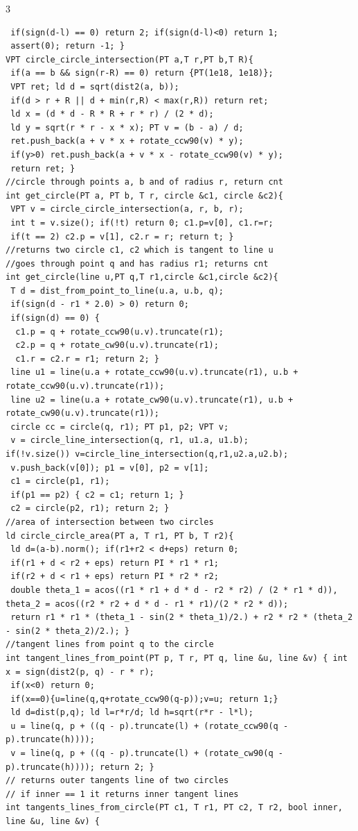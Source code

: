 \documentclass[8pt,a4paper,onesided]{article}
\begin{document}
\begin{multicols}{3}
\begin{verbatim}
 if(sign(d-l) == 0) return 2; if(sign(d-l)<0) return 1;
 assert(0); return -1; }
VPT circle_circle_intersection(PT a,T r,PT b,T R){
 if(a == b && sign(r-R) == 0) return {PT(1e18, 1e18)};
 VPT ret; ld d = sqrt(dist2(a, b));
 if(d > r + R || d + min(r,R) < max(r,R)) return ret;
 ld x = (d * d - R * R + r * r) / (2 * d);
 ld y = sqrt(r * r - x * x); PT v = (b - a) / d;
 ret.push_back(a + v * x + rotate_ccw90(v) * y);
 if(y>0) ret.push_back(a + v * x - rotate_ccw90(v) * y);
 return ret; }
//circle through points a, b and of radius r, return cnt
int get_circle(PT a, PT b, T r, circle &c1, circle &c2){
 VPT v = circle_circle_intersection(a, r, b, r);
 int t = v.size(); if(!t) return 0; c1.p=v[0], c1.r=r;
 if(t == 2) c2.p = v[1], c2.r = r; return t; }
//returns two circle c1, c2 which is tangent to line u
//goes through point q and has radius r1; returns cnt
int get_circle(line u,PT q,T r1,circle &c1,circle &c2){
 T d = dist_from_point_to_line(u.a, u.b, q);
 if(sign(d - r1 * 2.0) > 0) return 0;
 if(sign(d) == 0) {
  c1.p = q + rotate_ccw90(u.v).truncate(r1);
  c2.p = q + rotate_cw90(u.v).truncate(r1);
  c1.r = c2.r = r1; return 2; }
 line u1 = line(u.a + rotate_ccw90(u.v).truncate(r1), u.b + rotate_ccw90(u.v).truncate(r1));
 line u2 = line(u.a + rotate_cw90(u.v).truncate(r1), u.b + rotate_cw90(u.v).truncate(r1));
 circle cc = circle(q, r1); PT p1, p2; VPT v;
 v = circle_line_intersection(q, r1, u1.a, u1.b);
if(!v.size()) v=circle_line_intersection(q,r1,u2.a,u2.b);
 v.push_back(v[0]); p1 = v[0], p2 = v[1];
 c1 = circle(p1, r1);
 if(p1 == p2) { c2 = c1; return 1; }
 c2 = circle(p2, r1); return 2; }
//area of intersection between two circles
ld circle_circle_area(PT a, T r1, PT b, T r2){
 ld d=(a-b).norm(); if(r1+r2 < d+eps) return 0;
 if(r1 + d < r2 + eps) return PI * r1 * r1;
 if(r2 + d < r1 + eps) return PI * r2 * r2;
 double theta_1 = acos((r1 * r1 + d * d - r2 * r2) / (2 * r1 * d)), theta_2 = acos((r2 * r2 + d * d - r1 * r1)/(2 * r2 * d));
 return r1 * r1 * (theta_1 - sin(2 * theta_1)/2.) + r2 * r2 * (theta_2 - sin(2 * theta_2)/2.); }
//tangent lines from point q to the circle
int tangent_lines_from_point(PT p, T r, PT q, line &u, line &v) { int x = sign(dist2(p, q) - r * r);
 if(x<0) return 0;
 if(x==0){u=line(q,q+rotate_ccw90(q-p));v=u; return 1;}
 ld d=dist(p,q); ld l=r*r/d; ld h=sqrt(r*r - l*l);
 u = line(q, p + ((q - p).truncate(l) + (rotate_ccw90(q - p).truncate(h))));
 v = line(q, p + ((q - p).truncate(l) + (rotate_cw90(q - p).truncate(h)))); return 2; }
// returns outer tangents line of two circles
// if inner == 1 it returns inner tangent lines
int tangents_lines_from_circle(PT c1, T r1, PT c2, T r2, bool inner, line &u, line &v) {

\end{verbatim}
\end{multicols}
\end{document}

